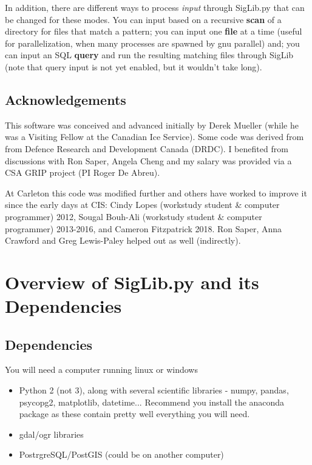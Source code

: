 \documentclass[letterpaper,10pt,openany,oneside]{sphinxmanual}
\begin{document}
In addition, there are different ways to process \emph{input} through
SigLib.py that can be changed for these modes. You can input based on a
recursive \textbf{scan} of a directory for files that match a pattern; you
can input one \textbf{file} at a time (useful for parallelization, when many
processes are spawned by gnu parallel) and; you can input an SQL
\textbf{query} and run the resulting matching files through SigLib (note that
query input is not yet enabled, but it wouldn't take long).


\section{Acknowledgements}
\label{intro:acknowledgements}
This software was conceived and advanced initially by Derek Mueller
(while he was a Visiting Fellow at the Canadian Ice Service). Some code
was derived from from Defence Research and Development Canada (DRDC). I
benefited from discussions with Ron Saper, Angela Cheng and my salary
was provided via a CSA GRIP project (PI Roger De Abreu).

At Carleton this code was modified further and others have worked to
improve it since the early days at CIS: Cindy Lopes (workstudy student \&
computer programmer) 2012, Sougal Bouh-Ali (workstudy student \& computer
programmer) 2013-2016, and Cameron Fitzpatrick 2018. Ron Saper, Anna
Crawford and Greg Lewis-Paley helped out as well (indirectly).


\chapter{Overview of SigLib.py and its Dependencies}
\label{project::doc}\label{project:overview-of-siglib-py-and-its-dependencies}

\section{Dependencies}
\label{project:dependencies}
You will need a computer running linux or windows
\begin{itemize}
\item {} 
Python 2 (not 3), along with several scientific libraries - numpy,
pandas, psycopg2, matplotlib, datetime... Recommend you install the
anaconda package as these contain pretty well everything you will
need.

\item {} 
gdal/ogr libraries

\item {} 
PostrgreSQL/PostGIS (could be on another computer)

\end{itemize}
\end{document}
